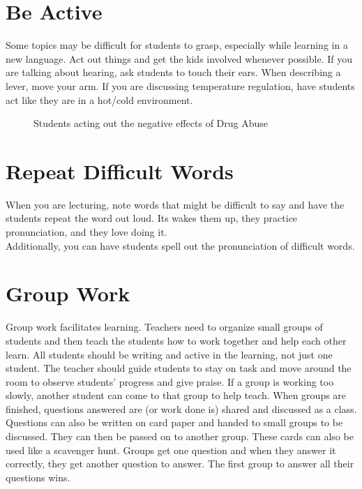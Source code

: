 \section{Be Active}
Some topics may be difficult for students to grasp, especially while learning in a new language.  Act out things and get the kids involved whenever possible.  If you are talking about hearing, ask students to touch their ears.  When describing a lever, move your arm.  If you are discussing temperature regulation, have students act like they are in a hot/cold environment.\\  

\begin{figure}[h!]
\centering
\setlength\fboxsep{0pt}
\setlength\fboxrule{2pt}
\caption{Students acting out the negative effects of Drug Abuse}
\end{figure}

\section{Repeat Difficult Words}
When you are lecturing, note words that might be difficult to say and have the students repeat the word out loud.  Its wakes them up, they practice pronunciation, and they love doing it.\\
Additionally, you can have students spell out the pronunciation of difficult words.

\section{Group Work}
Group work facilitates learning.  Teachers need to organize small groups of students and then teach the students how to work together and help each other learn. All students should be writing and active in the learning, not just one student.  The teacher should guide students to stay on task and move around the room to observe students' progress and give praise. If a group is working too slowly, another student can come to that group to help teach.  When groups are finished, questions answered are (or work done
is) shared and discussed as a class.\\

Questions can also be written on card paper and handed to small groups to be discussed. They can then be passed on to another group.  These cards can also be used like a scavenger hunt.  Groups get one question and when they answer it correctly, they get another question to answer.  The first group to answer all their questions wins.

